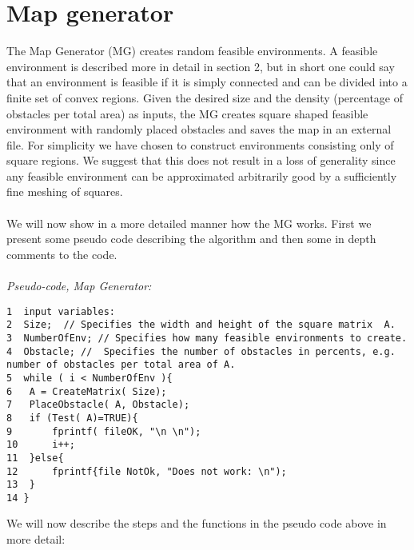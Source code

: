 \section{Map generator}
The Map Generator (MG) creates random feasible environments. A feasible environment is described more in detail in section 2, but in short one could say that an environment is feasible if it is simply connected and can be divided into a finite set of convex regions. Given the desired size and the density (percentage of obstacles per total area) as inputs, the MG creates square shaped feasible environment with randomly placed obstacles and saves the map in an external file. For simplicity we have chosen to construct environments consisting only of square regions. We suggest that this does not result in a loss of generality since any feasible environment can be approximated arbitrarily good by a sufficiently fine meshing of squares. \\
\\We will now show in a more detailed manner how the MG works. First we present some pseudo code describing the algorithm and then some in depth comments to the code.\\
\\ \noindent\emph{Pseudo-code, Map Generator:}
\begin{verbatim}
1  input variables:
2  Size;  // Specifies the width and height of the square matrix  A.
3  NumberOfEnv; // Specifies how many feasible environments to create.
4  Obstacle; //  Specifies the number of obstacles in percents, e.g. 
number of obstacles per total area of A.
5  while ( i < NumberOfEnv ){
6  	A = CreateMatrix( Size); 
7  	PlaceObstacle( A, Obstacle);
8  	if (Test( A)=TRUE){ 
9 		fprintf( fileOK, "\n \n");
10 		i++;
11	}else{
12 		fprintf{file NotOk, "Does not work: \n");
13 	}
14 }
\end{verbatim}
We will now describe the steps and the functions in the pseudo code above in more detail:
